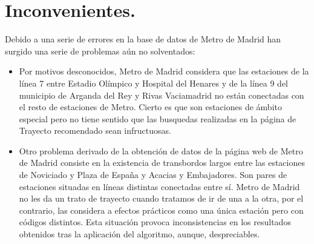 \documentclass[spanish, a4paper, 12pt] {article}
\begin{document}
\section{Inconvenientes.}
Debido a una serie de errores en la base de datos de Metro de Madrid han surgido una serie de problemas aún no solventados:
\begin{itemize}
\item{
Por motivos desconocidos, Metro de Madrid considera que las estaciones de la línea 7 entre Estadio Olímpico y Hospital del Henares y de la línea 9 del municipio de Arganda del Rey y Rivas Vaciamadrid no están conectadas con el resto de estaciones de Metro. Cierto es que son estaciones de ámbito especial pero no tiene sentido que las busquedas realizadas en la página de Trayecto recomendado sean infructuosas.
}
\item{
Otro problema derivado de la obtención de datos de la página web de Metro de Madrid consiste en la existencia de transbordos largos entre las estaciones de Noviciado y Plaza de España y Acacias y Embajadores. Son pares de estaciones situadas en líneas distintas conectadas entre sí. Metro de Madrid no les da un trato de trayecto cuando tratamos de ir de una a la otra, por el contrario, las considera a efectos prácticos como una única estación pero con códigos distintos. Esta situación provoca inconsistencias en los resultados obtenidos tras la aplicación del algoritmo, aunque, despreciables.
}
\end{itemize}
\end{document}
